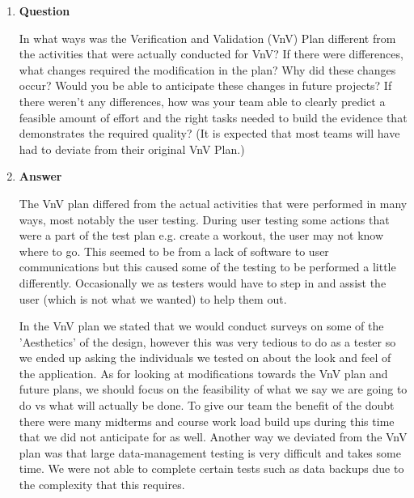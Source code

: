 \documentclass[12pt, titlepage]{article}
\begin{document}
\begin{enumerate}
	\item \textbf{Question} 
	
	In what ways was the Verification and Validation (VnV) Plan different
	from the activities that were actually conducted for VnV?  If there were
	differences, what changes required the modification in the plan?  Why did
	these changes occur?  Would you be able to anticipate these changes in future
	projects?  If there weren't any differences, how was your team able to clearly
	predict a feasible amount of effort and the right tasks needed to build the
	evidence that demonstrates the required quality?  (It is expected that most
	teams will have had to deviate from their original VnV Plan.)
	
	\item \textbf{Answer}
	
	The VnV plan differed from the actual activities that were performed in many ways, most notably the user testing. During user testing some actions that were a part of the test plan e.g. create a workout, the user may not know where to go. This seemed to be from a lack of software to user communications but this caused some of the testing to be performed a little differently. Occasionally we as testers would have to step in and assist the user (which is not what we wanted) to help them out.
	 
	In the VnV plan we stated that we would conduct surveys on some of the 'Aesthetics' of the design, however this was very tedious to do as a tester so we ended up asking the individuals we tested on about the look and feel of the application. As for looking at modifications towards the VnV plan and future plans, we should focus on the feasibility of what we say we are going to do vs what will actually be done. To give our team the benefit of the doubt there were many midterms and course work load build ups during this time that we did not anticipate for as well. Another way we deviated from the VnV plan was that large data-management testing is very difficult and takes some time. We were not able to complete certain tests such as data backups due to the complexity that this requires. 
\end{enumerate}
\end{document}
